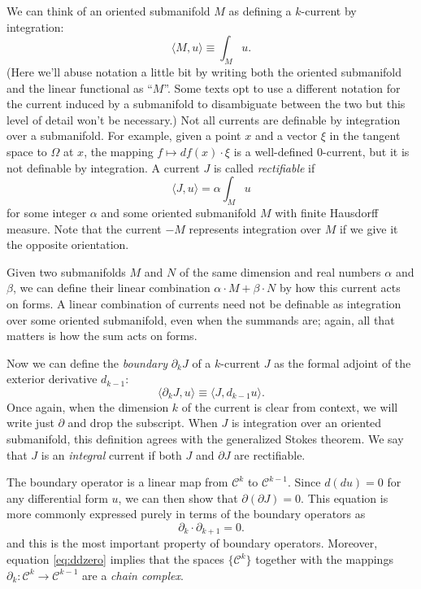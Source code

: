 \documentclass[twocolumn]{article}
\begin{document}
We can think of an oriented submanifold $M$ as defining a $k$-current by integration:
\begin{equation}
    \langle M, u\rangle \equiv \int_M u.
\end{equation}
(Here we'll abuse notation a little bit by writing both the oriented submanifold and the linear functional as ``$M$''.
Some texts opt to use a different notation for the current induced by a submanifold to disambiguate between the two but this level of detail won't be necessary.)
Not all currents are definable by integration over a submanifold.
For example, given a point $x$ and a vector $\xi$ in the tangent space to $\Omega$ at $x$, the mapping $f \mapsto df(x)\cdot\xi$ is a well-defined 0-current, but it is not definable by integration.
A current $J$ is called \emph{rectifiable} if
\begin{equation}
    \langle J, u\rangle = \alpha\int_Mu
\end{equation}
for some integer $\alpha$ and some oriented submanifold $M$ with finite Hausdorff measure.
Note that the current $-M$ represents integration over $M$ if we give it the opposite orientation.

Given two submanifolds $M$ and $N$ of the same dimension and real numbers $\alpha$ and $\beta$, we can define their linear combination $\alpha \cdot M + \beta\cdot N$ by how this current acts on forms.
A linear combination of currents need not be definable as integration over some oriented submanifold, even when the summands are; again, all that matters is how the sum acts on forms.

Now we can define the \emph{boundary} $\partial_k J$ of a $k$-current $J$ as the formal adjoint of the exterior derivative $d_{k - 1}$:
\begin{equation}
    \langle\partial_k J, u\rangle \equiv \langle J, d_{k - 1}u\rangle.
\end{equation}
Once again, when the dimension $k$ of the current is clear from context, we will write just $\partial$ and drop the subscript.
When $J$ is integration over an oriented submanifold, this definition agrees with the generalized Stokes theorem.
We say that $J$ is an \emph{integral} current if both $J$ and $\partial J$ are rectifiable.

The boundary operator is a linear map from $\mathscr{C}^k$ to $\mathscr{C}^{k - 1}$.
Since $d(du) = 0$ for any differential form $u$, we can then show that $\partial(\partial J) = 0$.
This equation is more commonly expressed purely in terms of the boundary operators as
\begin{equation}
    \partial_k\cdot\partial_{k + 1} = 0.
    \label{eq:ddzero}
\end{equation}
and this is the most important property of boundary operators.
Moreover, equation \eqref{eq:ddzero} implies that the spaces $\{\mathscr{C}^k\}$ together with the mappings $\partial_k : \mathscr{C}^k \to \mathscr{C}^{k - 1}$ are a \emph{chain complex}.
\end{document}
